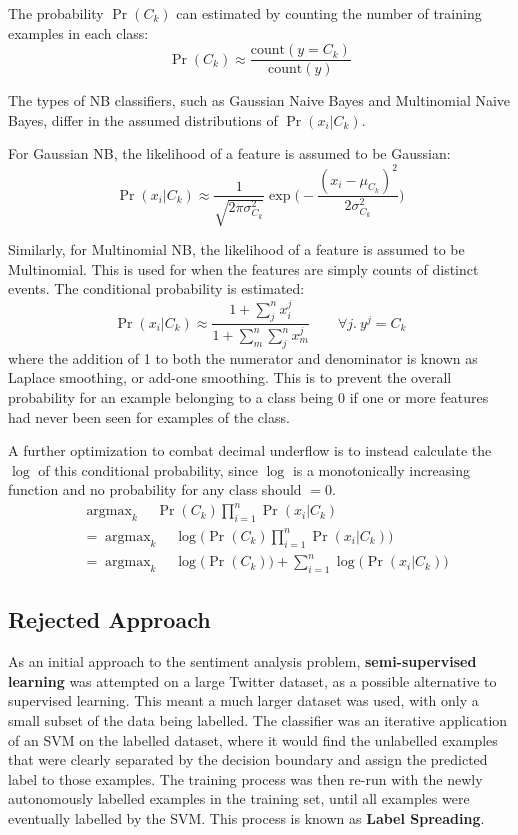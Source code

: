 \documentclass[12pt,a4paper,twoside,openright]{report}
\DeclareMathOperator*{\argmax}{argmax}
\begin{document}
The probability $\Pr(C_k)$ can estimated by counting
the number of training examples in each class:
\begin{equation}
\Pr(C_k) \approx \frac{\text{count}(y = C_k)}{\text{count}(y)}
\end{equation}

The types of NB classifiers, such as Gaussian Naive Bayes and Multinomial Naive Bayes,
differ in the assumed distributions of $\Pr(x_i | C_k)$. 

For Gaussian NB, the likelihood of a feature is assumed to be Gaussian:
\begin{equation}
	\Pr(x_i | C_k) \approx \frac{1}{\sqrt{2\pi\sigma_{C_k}^2}} \exp\bigg(-\frac{(x_i - \mu_{C_k})^2}{2\sigma_{C_k}^2}\bigg)
\end{equation}

Similarly, for Multinomial NB, the likelihood of a feature is assumed to be Multinomial. This is used
for when the features are simply counts of distinct events. The 
conditional probability is estimated\cite{Manning08}:
\begin{equation}
	\Pr(x_i | C_k) \approx \frac{1 + \sum_j^n x_i^j}{1 + \sum_m^n \sum_j^n x_m^j} \qquad \forall j.\ y^j=C_k
\end{equation}
where the addition of 1 to both the numerator and denominator is known as Laplace smoothing, or add-one smoothing.
This is to prevent the overall probability for an example belonging to a class being 0 if one or more features had 
never been seen for examples of the class.

A further optimization to combat decimal underflow is to instead calculate the $\log$ of this conditional probability,
since $\log$ is a monotonically increasing function and no probability for any class should $= 0$.
\begin{align}
&\argmax_k\quad \Pr(C_k)\prod_{i=1}^n \Pr(x_i | C_k)\\
&=\argmax_k\quad \log\Big(\Pr(C_k)\prod_{i=1}^n \Pr(x_i | C_k)\Big)\\
&= \argmax_k\quad \log\big(\Pr(C_k)\big) + \sum_{i=1}^n \log\big(\Pr(x_i | C_k)\big)
\end{align}

\subsection{Rejected Approach}
\label{sec:prepRej}

As an initial approach to the sentiment analysis problem, \textbf{semi-supervised learning} was attempted
on a large Twitter dataset, as a possible alternative to supervised learning. This meant a much larger dataset
was used, with only a small subset of the data being labelled. The classifier was an iterative application
of an SVM on the labelled dataset, where it would find the unlabelled examples that were clearly
separated by the decision boundary and assign the predicted label to those examples. The training process
was then re-run with the newly autonomously labelled examples in the training set, until all examples
were eventually labelled by the SVM. This process is known as \textbf{Label Spreading}.
\end{document}
